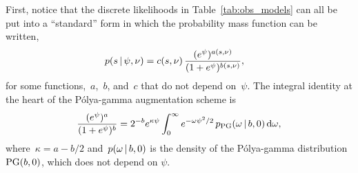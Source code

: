 First, notice that the discrete likelihoods in Table~\ref{tab:obs_models}
can all be put into  a ``standard'' form in which the probability
mass function can be written,
\begin{align}
  p(s \,|\, \psi, \nu) &= c(s, \nu) \, \frac{(e^\psi)^{a(s, \nu)}}{(1+e^\psi)^{b(s, \nu)}},
\end{align}
for some functions,~$a$,~$b$, and~$c$ that do not depend on~$\psi$.
The integral identity at the heart of the P\'{o}lya-gamma augmentation scheme  is
\begin{align}
\label{eq:pg_identity}
\frac{(e^{\psi})^a}{(1+e^{\psi})^b} = 2^{-b} e^{\kappa \psi} \int_{0}^{\infty} e^{-\omega \psi^2 /2} \, p_{\mathrm{PG}}(\omega \,|\, b, 0) \, \mathrm{d}\omega,
\end{align}
where~${\kappa=a-b/2}$ and~$p(\omega\,|\, b, 0)$ is the density of the P\'{o}lya-gamma
distribution~${\mathrm{PG}(b, 0)}$, which does not depend on $\psi$.


